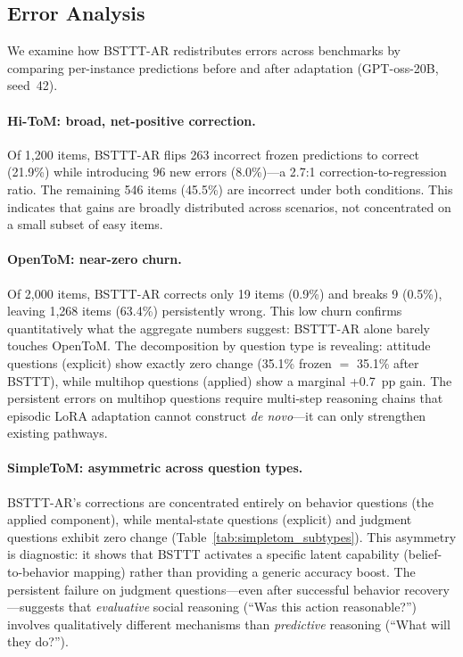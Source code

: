 \subsection{Error Analysis}
\label{sec:errors}

We examine how BSTTT-AR redistributes errors across benchmarks by comparing per-instance predictions before and after adaptation (GPT-oss-20B, seed~42).

\paragraph{Hi-ToM: broad, net-positive correction.}
Of 1{,}200 items, BSTTT-AR flips 263 incorrect frozen predictions to correct (21.9\%) while introducing 96 new errors (8.0\%)---a 2.7:1 correction-to-regression ratio.
The remaining 546 items (45.5\%) are incorrect under both conditions.
This indicates that gains are broadly distributed across scenarios, not concentrated on a small subset of easy items.

\paragraph{OpenToM: near-zero churn.}
Of 2{,}000 items, BSTTT-AR corrects only 19 items (0.9\%) and breaks 9 (0.5\%), leaving 1{,}268 items (63.4\%) persistently wrong.
This low churn confirms quantitatively what the aggregate numbers suggest: BSTTT-AR alone barely touches OpenToM.
The decomposition by question type is revealing: attitude questions (explicit) show exactly zero change (35.1\% frozen $=$ 35.1\% after BSTTT), while multihop questions (applied) show a marginal +0.7~pp gain.
The persistent errors on multihop questions require multi-step reasoning chains that episodic LoRA adaptation cannot construct \emph{de novo}---it can only strengthen existing pathways.

\paragraph{SimpleToM: asymmetric across question types.}
BSTTT-AR's corrections are concentrated entirely on behavior questions (the applied component), while mental-state questions (explicit) and judgment questions exhibit zero change (Table~\ref{tab:simpletom_subtypes}).
This asymmetry is diagnostic: it shows that BSTTT activates a specific latent capability (belief-to-behavior mapping) rather than providing a generic accuracy boost.
The persistent failure on judgment questions---even after successful behavior recovery---suggests that \emph{evaluative} social reasoning (``Was this action reasonable?'') involves qualitatively different mechanisms than \emph{predictive} reasoning (``What will they do?'').

